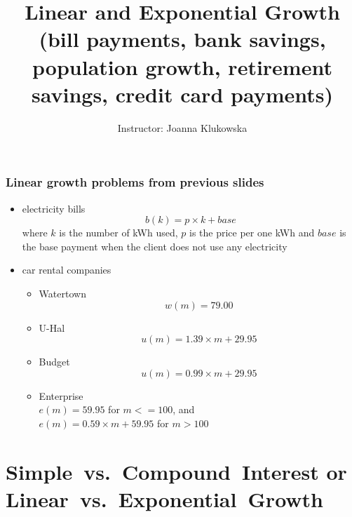 \documentclass[notheorems
          ]
          {beamer}
\begin{document}
\title[Linear and Exponential Growth]{Linear and Exponential Growth \\ 
(bill payments, bank savings, population growth, retirement savings, credit card payments)  }
\author[]{Instructor: Joanna Klukowska }
\date{}

\frame{\titlepage} 





\begin{frame}
 \frametitle { Linear growth problems from previous slides }
 
 
 \begin{itemize}
  \item electricity bills 
    $$b(k) = p \times k + base$$
    where $k$ is the number of kWh used, $p$ is the price per one kWh and $base$ is the base payment when the 
    client does not use any electricity 
  \item car rental companies 
   \begin{itemize}[<*>] 
    \item Watertown $$w(m) = 79.00$$  
    \item U-Hal $$u(m) = 1.39 \times m + 29.95$$
    \item Budget  $$u(m) = 0.99 \times m + 29.95$$
    \item Enterprise \\\hspace{1in} $e(m) = 59.95$ for $m <= 100$, and \\\hspace{1in} $e(m) = 0.59\times m + 59.95$ for $m >100$
  \end{itemize}
        
 \end{itemize}

\end{frame}




\section{ Simple~vs.~Compound~Interest or Linear~vs.~Exponential~Growth   }
\end{document}
